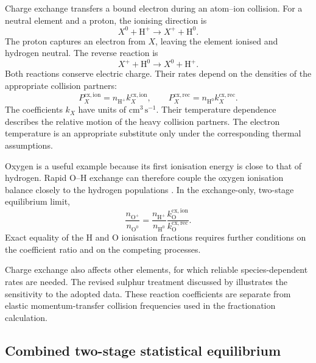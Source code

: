 Charge exchange transfers a bound electron during an atom--ion collision.
For a neutral element and a proton, the ionising direction is
\begin{equation}
 X^0+\mathrm H^+
 \longrightarrow X^++\mathrm H^0.
 \label{eq:ion_cx_forward}
\end{equation}
The proton captures an electron from \(X\), leaving the element ionised and
hydrogen neutral. The reverse reaction is
\begin{equation}
 X^++\mathrm H^0
 \longrightarrow X^0+\mathrm H^+.
 \label{eq:ion_cx_reverse}
\end{equation}
Both reactions conserve electric charge. Their rates depend on the densities
of the appropriate collision partners:
\begin{equation}
 P_X^{\mathrm{cx,ion}}
 =n_{\mathrm{H^+}}k_X^{\mathrm{cx,ion}},
 \qquad
 P_X^{\mathrm{cx,rec}}
 =n_{\mathrm{H^0}}k_X^{\mathrm{cx,rec}}.
 \label{eq:ion_cx_rates}
\end{equation}
The coefficients \(k_X\) have units of \(\mathrm{cm^3\,s^{-1}}\).
Their temperature dependence describes the relative motion of the heavy
collision partners. The electron temperature is an appropriate substitute
only under the corresponding thermal assumptions.

Oxygen is a useful example because its first ionisation energy is close to
that of hydrogen. Rapid O--H exchange can therefore couple the oxygen
ionisation balance closely to the hydrogen populations
\cite{dufresne2021}. In the exchange-only, two-stage equilibrium limit,
\begin{equation}
 \frac{n_{\mathrm{O^+}}}{n_{\mathrm{O^0}}}
 =
 \frac{n_{\mathrm{H^+}}}{n_{\mathrm{H^0}}}
 \frac{k_{\mathrm O}^{\mathrm{cx,ion}}}
      {k_{\mathrm O}^{\mathrm{cx,rec}}}.
 \label{eq:ion_oxygen_exchange_limit}
\end{equation}
Exact equality of the H and O ionisation fractions requires further conditions
on the coefficient ratio and on the competing processes.

Charge exchange also affects other elements, for which reliable
species-dependent rates are needed. The revised sulphur treatment discussed by
\cite{laming2021} illustrates the sensitivity to the adopted data.
These reaction coefficients are separate from elastic momentum-transfer
collision frequencies used in the fractionation calculation.

\subsection{Combined two-stage statistical equilibrium}
\label{subsec:ion_two_stage}

